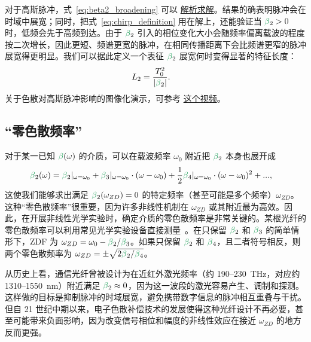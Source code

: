 对于高斯脉冲，式~\ref{eq:beta2_broadening} 可以 \href{https://drive.google.com/file/d/17Ab3bg0Hx0x8J-5lR29ejFg0eOlv6Psh/view?usp=sharing}{解析求解}。结果的确表明脉冲会在时域中展宽；同时，把式~\ref{eq:chirp_definition} 用在解上，还能验证当 $\betag_2>0$ 时，低频会先于高频到达。由于 $\betag_2$ 引入的相位变化大小会随频率偏离载波的程度按二次增长，因此更短、频谱更宽的脉冲，在相同传播距离下会比频谱更窄的脉冲展宽得更明显。我们可以据此定义一个表征 $\betag_2$ 展宽何时变得显著的特征长度：
\begin{align}
    \label{eq:Dispersion_length}
    L_{2} &= \frac{T_0^2}{|\betag_2|}.
\end{align}
关于色散对高斯脉冲影响的图像化演示，可参考 \href{https://www.youtube.com/watch?v=BP6Ra98AEuU}{这个视频}。

\subsection{“零色散频率”}
\label{subsec:ZDF}
对于某一已知 $\betag(\omega)$ 的介质，可以在载波频率 $\omega_0$ 附近把 $\betag_2$ 本身也展开成
\begin{align}
\label{eq:ZDF}
    \betag_2(\omega) &= \betag_2|_{\omega=\omega_0} + \betag_3|_{\omega=\omega_0}\cdot(\omega-\omega_0)+\frac{1}{2}\betag_4|_{\omega=\omega_0}\cdot(\omega-\omega_0)^2 +...,
\end{align}
这使我们能够求出满足 $\betag_2(\omega_{ZD})=0$ 的特定频率（甚至可能是多个频率）$\omega_{ZD}$。这种“零色散频率”很重要，因为许多非线性机制在 $\omega_{ZD}$ 或其附近最为高效。因此，在开展非线性光学实验时，确定介质的零色散频率是非常关键的。某根光纤的零色散频率可以利用常见光学实验设备直接测量~\cite{zero_disp_measurement}。在只保留 $\betag_2$ 和 $\betag_3$ 的简单情形下，ZDF 为 $\omega_{ZD} = \omega_0-\betag_2/\betag_3$。如果只保留 $\betag_2$ 和 $\betag_4$，且二者符号相反，则两个零色散频率为 $\omega_{ZD} = \pm \sqrt{2\betag_2/\betag_4}$。

从历史上看，通信光纤曾被设计为在近红外激光频率（约 190--230~THz，对应约 1310--1550~nm）附近满足 $\betag_2\approx0$，因为这一波段的激光容易产生、调制和探测。这样做的目标是抑制脉冲的时域展宽，避免携带数字信息的脉冲相互重叠与干扰。但自 21 世纪中期以来，电子色散补偿技术的发展使得这种光纤设计不再必要，甚至可能带来负面影响，因为改变信号相位和幅度的非线性效应在接近 $\omega_{ZD}$ 的地方反而更强。



